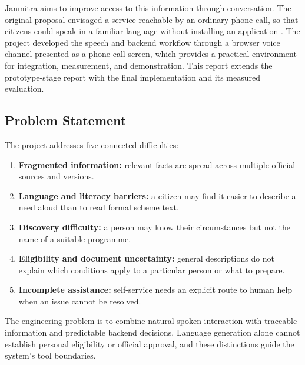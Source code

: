 \documentclass[11pt,a4paper,oneside]{report}
\begin{document}
Janmitra aims to improve access to this information through conversation. The
original proposal envisaged a service reachable by an ordinary phone call, so that
citizens could speak in a familiar language without installing an application
\cite{proposal}. The project developed the speech and backend workflow through a
browser voice channel presented as a phone-call screen, which provides a practical
environment for integration, measurement, and demonstration. This report extends
the prototype-stage report \cite{prototype} with the final implementation and its
measured evaluation.

\subsection{Problem Statement}
The project addresses five connected difficulties:
\begin{enumerate}
  \item \textbf{Fragmented information:} relevant facts are spread across
    multiple official sources and versions.
  \item \textbf{Language and literacy barriers:} a citizen may find it easier to
    describe a need aloud than to read formal scheme text.
  \item \textbf{Discovery difficulty:} a person may know their circumstances but
    not the name of a suitable programme.
  \item \textbf{Eligibility and document uncertainty:} general descriptions do not
    explain which conditions apply to a particular person or what to prepare.
  \item \textbf{Incomplete assistance:} self-service needs an explicit route to
    human help when an issue cannot be resolved.
\end{enumerate}

The engineering problem is to combine natural spoken interaction with traceable
information and predictable backend decisions. Language generation alone cannot
establish personal eligibility or official approval, and these distinctions guide
the system's tool boundaries.
\end{document}
